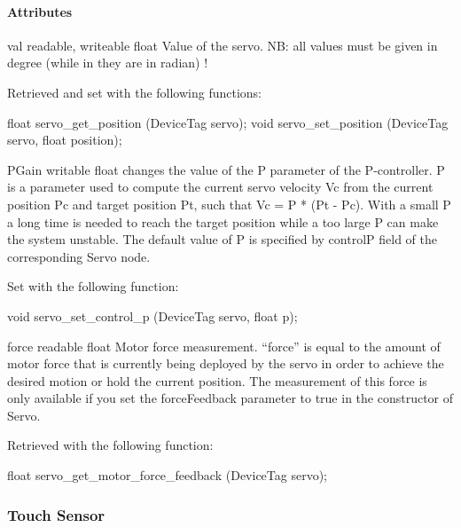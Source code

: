 \paragraph{Attributes}
\noindent
\begin{itemize}
\begin{attribute}{val}
  {readable, writeable}
  {float}
  {}
  Value of the servo. NB: all values must be given in
  degree (while in \webots they are in radian) !

  Retrieved and set with the following \webots functions:
\begin{cxx}
float servo_get_position  (DeviceTag servo);
void servo_set_position  (DeviceTag servo, float position);
\end{cxx}
\end{attribute}

\begin{attribute}{PGain}
  {writable}
  {float}
  {}
  changes the value of the P parameter of the
 P-{}controller. P is a parameter used to compute the current servo
 velocity Vc from the current position Pc and target position Pt, such
 that Vc = P * (Pt -{} Pc).  With a small P a long time is needed to
 reach the target position while a too large P can make the system
 unstable.  The default value of P is specified by controlP field of
 the corresponding \webots Servo node.


 Set with the following \webots function:

\begin{cxx}
void servo_set_control_p  (DeviceTag servo, float p);
\end{cxx}
\end{attribute}

\begin{attribute}{force}
  {readable}
  {float}
  {}
  Motor force measurement. ``force'' is equal to the amount
  of motor force that is currently being deployed by the servo in order
  to achieve the desired motion or hold the current position.  The
  measurement of this force is only available if you set the
  forceFeedback parameter to true in the constructor of Servo.

  Retrieved with the following \webots function:
\begin{cxx}
float servo_get_motor_force_feedback  (DeviceTag servo);
\end{cxx}
\end{attribute}
\end{itemize}

\subsubsection{Touch Sensor}


